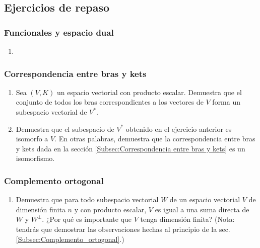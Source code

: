 \documentclass[12pt,dvipsnames]{article}
\begin{document}
\subsection{Ejercicios de repaso} \label{}

\subsubsection{Funcionales y espacio dual} \label{Ejer:Funcionales_y_espacio_dual}
\begin{enumerate}
    \item
\end{enumerate}

\subsubsection{Correspondencia entre bras y kets} \label{Ejer:Correspondencia_entre_bras_y_kets}
\begin{enumerate}
    \item Sea $(V,K)$ un espacio vectorial con producto escalar. Demuestra que el conjunto de todos los bras correspondientes a los vectores de $V$ forma un subespacio vectorial de $V^*$.
    \item Demuestra que el subespacio de $V^*$ obtenido en el ejercicio anterior es isomorfo a $V$. En otras palabras, demuestra que la correspondencia entre bras y kets dada en la sección \ref{Subsec:Correspondencia entre bras y kets} es un isomorfismo.
\end{enumerate}

\subsubsection{Complemento ortogonal} \label{Ejer:Complemento_ortogonal}
\begin{enumerate}
    \item Demuestra que para todo subespacio vectorial $W$ de un espacio vectorial $V$ de dimensión finita $n$ y con producto escalar, $V$ es igual a una suma directa de $W$ y $W^{\perp}.$ ¿Por qué es importante que $V$ tenga dimensión finita? (Nota: tendrás que demostrar las observaciones hechas al principio de la sec. \ref{Subsec:Complemento_ortogonal}.)
\end{enumerate}
\end{document}

